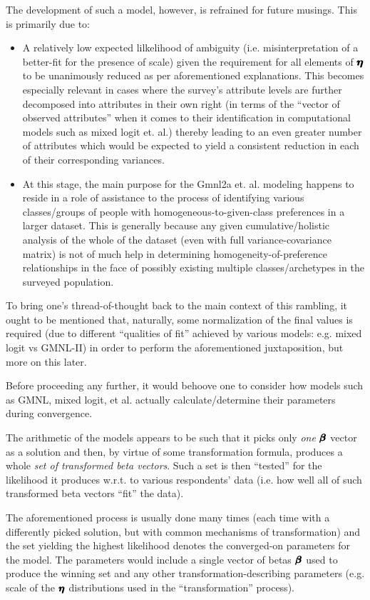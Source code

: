\documentclass[12pt,a4paper]{article}
\begin{document}
The development of such a model, however, is refrained for future musings. This is primarily due to:
\begin{itemize}
\item A relatively low expected lilkelihood of ambiguity (i.e. misinterpretation of a better-fit for the presence of scale) given the requirement for all elements of \(\pmb{\hm{\eta}}\) to be unanimously reduced as per aforementioned explanations. This becomes especially relevant in cases where the survey's attribute levels are further decomposed into attributes in their own right (in terms of the ``vector of observed attributes'' when it comes to their identification in computational models such as mixed logit et. al.) thereby leading to an even greater number of attributes which would be expected to yield a consistent reduction in each of their corresponding variances.
\item At this stage, the main purpose for the Gmnl2a et. al. modeling happens to reside in a role of assistance to the process of identifying various classes/groups of people with homogeneous-to-given-class preferences in a larger dataset. This is generally because any given cumulative/holistic analysis of the whole of the dataset (even with full variance-covariance matrix) is not of much help in determining  homogeneity-of-preference relationships in the face of possibly existing multiple classes/archetypes in the surveyed population. 
\end{itemize}

To bring one's thread-of-thought back to the main context of this rambling, it ought to be mentioned that, naturally, some normalization of the final values is required (due to different ``qualities of fit'' achieved by various models: e.g. mixed logit vs GMNL-II) in order to perform the aforementioned juxtaposition, but more on this later.

Before proceeding any further, it would behoove one to consider how models such as GMNL, mixed logit, et al. actually calculate/determine their parameters during convergence.

The arithmetic of the models appears to be such that it picks only \textit{one} \(\pmb{\hm{\beta}}\) vector as a solution and then, by virtue of some transformation formula, produces a whole \textit{set of transformed beta vectors}. Such a set is then ``tested'' for the likelihood it produces w.r.t. to various respondents' data (i.e. how well all of such transformed beta vectors ``fit'' the data). 

The aforementioned process is usually done many times (each time with a differently picked solution, but with common mechanisms of transformation) and the set yielding the highest likelihood denotes the converged-on parameters for the model. The parameters would include a single vector of betas \(\pmb{\hm{\beta}}\) used to produce the winning set and any other transformation-describing parameters (e.g. scale of the \(\pmb{\hm{\eta}}\) distributions used in the ``transformation'' process).
\end{document}
